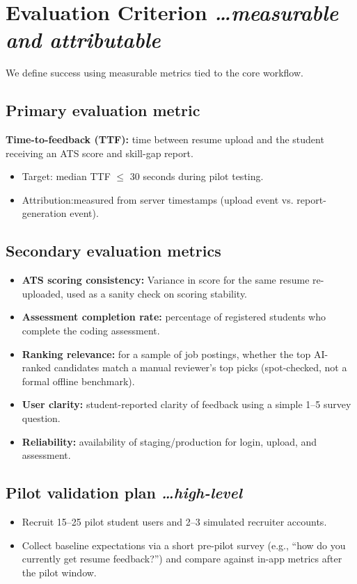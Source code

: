 \documentclass[11pt,a4paper]{article}
\newcommand{\BvrHint}[1]{%
  {\normalfont\normalsize\itshape\hfill #1}}
\begin{document}
\section{Evaluation Criterion %
\BvrHint{\ldots measurable and attributable}}
We define success using measurable metrics tied to the core workflow.

\subsection{Primary evaluation metric}
\textbf{Time-to-feedback (TTF):} time between resume upload and the student receiving an ATS score and skill-gap report.
\begin{itemize}[leftmargin=0.7cm]
    \item Target: median TTF $\le$ 30 seconds during pilot testing.
    \item Attribution:measured from server timestamps (upload event vs. report-generation event).
\end{itemize}

\subsection{Secondary evaluation metrics}
\begin{itemize}[leftmargin=0.7cm]
    \item \textbf{ATS scoring consistency:} Variance in score for the same resume re-uploaded, used as a sanity check on scoring stability.
    \item \textbf{Assessment completion rate:} percentage of registered students who complete the coding assessment.
    \item \textbf{Ranking relevance:} for a sample of job postings, whether the top AI-ranked candidates match a manual reviewer's top picks (spot-checked, not a formal offline benchmark).
    \item \textbf{User clarity:} student-reported clarity of feedback using a simple 1–5 survey question.
    \item \textbf{Reliability:} availability of staging/production for login, upload, and assessment.
\end{itemize}

\subsection{Pilot validation plan %
\BvrHint{\ldots high-level}}
\begin{itemize}[leftmargin=0.7cm]
    \item Recruit 15–25 pilot student users and 2–3 simulated recruiter accounts. 
    \item Collect baseline expectations via a short pre-pilot survey (e.g., “how do you currently get resume feedback?”) and compare against in-app metrics after the pilot window.
\end{itemize}
\end{document}
